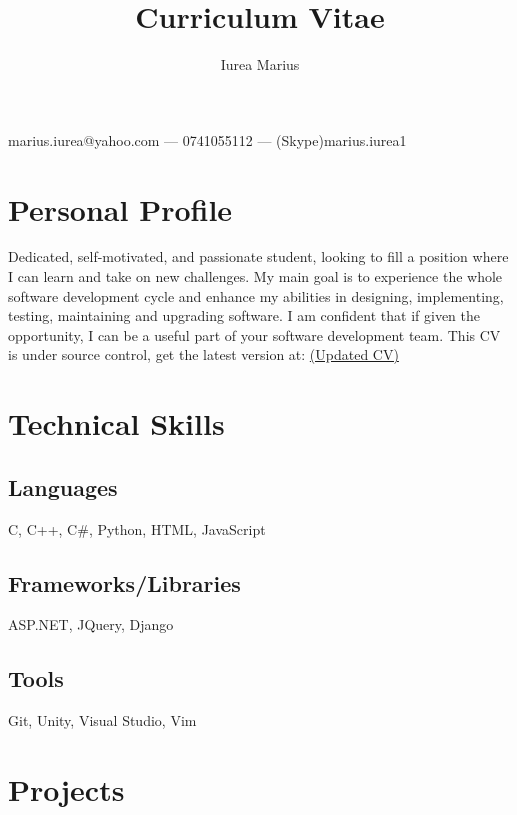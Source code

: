 \documentclass[a4paper,hidelinks,12pt]{article}
\begin{document}
\title{Curriculum Vitae}
\author{Iurea Marius}
\renewcommand{\maketitle}
{
        \begin{center}
        {\huge\bfseries
        \thetitle

        \theauthor}

        marius.iurea@yahoo.com --- 0741055112 --- (Skype)marius.iurea1

        \end{center}
}

\maketitle

\section{Personal Profile}
Dedicated, self-motivated, and passionate student, looking to fill a position where I can learn and take on new
challenges. My main goal is to experience the whole software development cycle and enhance my abilities in 
designing, implementing, testing, maintaining and upgrading software. I am confident that if given the 
opportunity, I can be a useful part of your software development team. This CV is under source control, get the
latest version at: \href{https://github.com/IureaMarius/CV}{(Updated CV)}



\section{Technical Skills}
\subsection{Languages}
C, C++, C\#, Python, HTML, JavaScript
\subsection{Frameworks/Libraries}
ASP.NET, JQuery, Django
\subsection{Tools}
Git, Unity, Visual Studio, Vim
\section{Projects}
\end{document}
